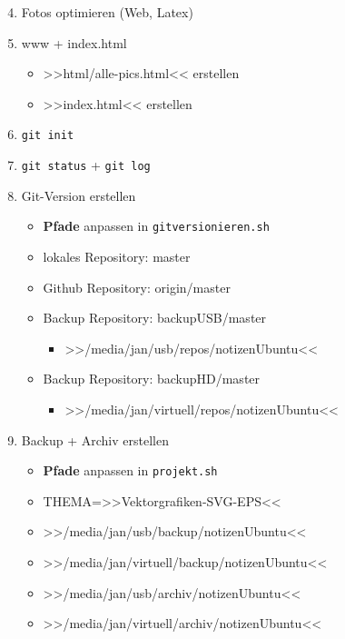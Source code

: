\begin{enumerate}
\setcounter{enumi}{3}
\item
  Fotos optimieren (Web, Latex)
\item
  www + index.html

  \begin{itemize}
  \item
    >>html/alle-pics.html<< erstellen
  \item
    >>index.html<< erstellen
  \end{itemize}
\item
  \verb|git init|
\item
  \verb|git status| +
  \verb|git log|
\item
  Git-Version erstellen

  \begin{itemize}
  \item
    \textbf{Pfade} anpassen in
    \verb|gitversionieren.sh|
  \item
    lokales Repository: master
  \item
    Github Repository: origin/master
  \item
    Backup Repository: backupUSB/master

    \begin{itemize}
    \item
      >>/media/jan/usb/repos/notizenUbuntu<<
    \end{itemize}
  \item
    Backup Repository: backupHD/master

    \begin{itemize}
    \item
      >>/media/jan/virtuell/repos/notizenUbuntu<<
    \end{itemize}
  \end{itemize}
\item
  Backup + Archiv erstellen

  \begin{itemize}
  \item
    \textbf{Pfade} anpassen in \verb|projekt.sh|
  \item
    THEMA=>>Vektorgrafiken-SVG-EPS<<
  \item
    >>/media/jan/usb/backup/notizenUbuntu<<
  \item
    >>/media/jan/virtuell/backup/notizenUbuntu<<
  \item
    >>/media/jan/usb/archiv/notizenUbuntu<<
  \item
    >>/media/jan/virtuell/archiv/notizenUbuntu<<
  \end{itemize}
\end{enumerate}
